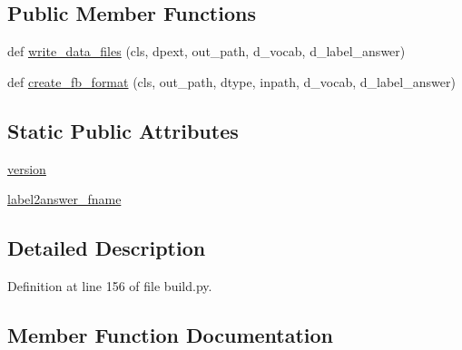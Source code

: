 \subsection*{Public Member Functions}
\begin{DoxyCompactItemize}
\item 
def \hyperlink{classparlai_1_1tasks_1_1insuranceqa_1_1build_1_1ParseInsuranceQAV2_a8a510d31a4f0b733beb887de3c8379b0}{write\+\_\+data\+\_\+files} (cls, dpext, out\+\_\+path, d\+\_\+vocab, d\+\_\+label\+\_\+answer)
\item 
def \hyperlink{classparlai_1_1tasks_1_1insuranceqa_1_1build_1_1ParseInsuranceQAV2_abaa749229881633590c411cdaf79c6ff}{create\+\_\+fb\+\_\+format} (cls, out\+\_\+path, dtype, inpath, d\+\_\+vocab, d\+\_\+label\+\_\+answer)
\end{DoxyCompactItemize}
\subsection*{Static Public Attributes}
\begin{DoxyCompactItemize}
\item 
\hyperlink{classparlai_1_1tasks_1_1insuranceqa_1_1build_1_1ParseInsuranceQAV2_a638ee7d37982261f4cfd3e099c8668a3}{version}
\item 
\hyperlink{classparlai_1_1tasks_1_1insuranceqa_1_1build_1_1ParseInsuranceQAV2_a33951ca3b8a8270c1acd65b14bac757f}{label2answer\+\_\+fname}
\end{DoxyCompactItemize}


\subsection{Detailed Description}


Definition at line 156 of file build.\+py.



\subsection{Member Function Documentation}
\mbox{\label{classparlai_1_1tasks_1_1insuranceqa_1_1build_1_1ParseInsuranceQAV2_abaa749229881633590c411cdaf79c6ff}} 
